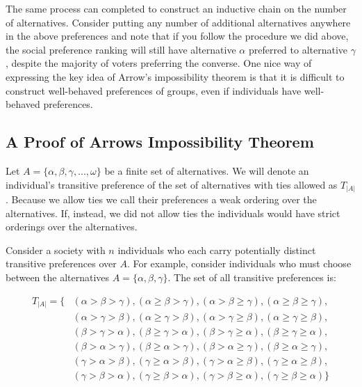 \documentclass{amsart}
\theoremstyle{plain}
\begin{document}
The same process can completed to construct an inductive chain on the number of alternatives. Consider putting any number of additional alternatives anywhere in the above preferences and note that if you follow the procedure we did above, the social preference ranking will still have alternative $\alpha$ preferred to alternative $\gamma$, despite the majority of voters preferring the converse. One nice way of expressing the key idea of Arrow's impossibility theorem is that it is difficult to construct well-behaved preferences of groups, even if individuals have well-behaved preferences. 

\subsection{A Proof of Arrows Impossibility Theorem \cite{Geanakoplos, Arrow}} 

Let $A = \{\alpha, \beta, \gamma, ... , \omega\}$ be a finite set of alternatives. We will denote an individual's transitive preference of the set of alternatives with ties allowed as $T_{|A|}$. Because we allow ties we call their preferences a weak ordering over the alternatives. If, instead, we did not allow ties the individuals would have strict orderings over the alternatives.

Consider a society with $n$ individuals who each carry potentially distinct transitive preferences over $A$. For example, consider individuals who must choose between the alternatives $A = \{\alpha, \beta, \gamma\}.$ The set of all transitive preferences is:
\begin{center}
\begin{align*}
    T_{|A|} = \{ & (\alpha > \beta > \gamma), (\alpha \ge \beta > \gamma), (\alpha > \beta \ge \gamma), (\alpha \ge \beta \ge \gamma), \\ 
    & (\alpha > \gamma > \beta), (\alpha \ge \gamma > \beta), (\alpha > \gamma \ge \beta), (\alpha \ge \gamma \ge \beta), \\
    &  (\beta > \gamma > \alpha), (\beta \ge \gamma > \alpha), (\beta > \gamma \ge \alpha), (\beta \ge \gamma \ge \alpha), \\ 
    & (\beta > \alpha > \gamma), (\beta \ge \alpha > \gamma), (\beta > \alpha \ge \gamma), (\beta \ge \alpha \ge \gamma),\\
    & (\gamma > \alpha > \beta), (\gamma \ge \alpha > \beta), (\gamma > \alpha \ge \beta), (\gamma \ge \alpha \ge \beta), \\
    & (\gamma > \beta > \alpha), (\gamma \ge \beta > \alpha), (\gamma > \beta \ge \alpha), (\gamma \ge \beta \ge \alpha)\}
\end{align*}
\end{center}
\end{document}
